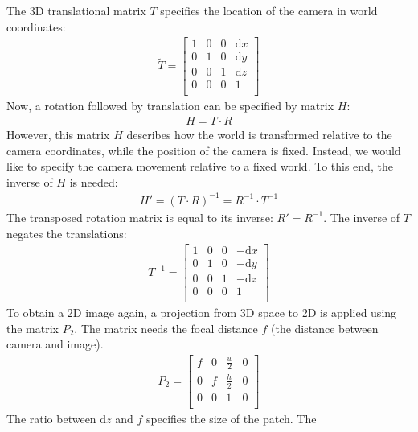 \documentclass[11pt]{report}
\begin{document}
  The 3D translational matrix $T$ specifies the location of the camera
  in world coordinates:
\begin{align*}
  \tilde{T} = \begin{bmatrix}
    1 & 0 & 0 & \text{d}x        \\
    0 & 1 & 0 & \text{d}y        \\
    0 & 0 & 1 & \text{d}z        \\
    0 & 0 & 0 & 1        \\
  \end{bmatrix}
\end{align*}
Now, a rotation followed by translation can be specified by matrix
$H$:
\begin{align}
  H = T \cdot R
\end{align}
However, this matrix $H$ describes how the world is transformed
relative to the camera coordinates, while the position of the camera
is fixed. Instead, we would like to specify the camera movement
relative to a fixed world. To this end, the inverse of $H$ is needed:
\begin{align}
  H' = (T \cdot R)^{-1} = R^{-1} \cdot T^{-1}
\end{align}
The transposed rotation matrix is equal to its inverse: $R' =
R^{-1}$. The inverse of $T$ negates the translations:
\begin{align*}
  T^{-1} = \begin{bmatrix}
  1 & 0 & 0 & -\text{d}x        \\
  0 & 1 & 0 & -\text{d}y        \\
  0 & 0 & 1 & -\text{d}z        \\
  0 & 0 & 0 & 1        \\
  \end{bmatrix}
\end{align*}
To obtain a 2D image again, a projection from 3D space to 2D is
applied using the matrix $P_2$. The matrix needs the focal distance
$f$ (the distance between camera and image).
\begin{align*}
    P_2 = 
  \begin{bmatrix}
              f     & 0 & \frac{w}{2} & 0       \\
              0     & f & \frac{h}{2} & 0       \\
              0     & 0 & 1           & 0       \\
  \end{bmatrix}
\end{align*}
The ratio between d$z$ and $f$ specifies the size of the patch. The
\end{document}
